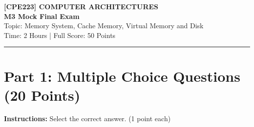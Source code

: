 \documentclass[a4paper,12pt]{article}
\begin{document}
\thispagestyle{empty}
\begin{center}
    \textbf{\Large [CPE223] COMPUTER ARCHITECTURES}\\
    \vspace{0.2cm}
    \textbf{\large M3 Mock Final Exam}\\
    \vspace{0.2cm}
    Topic: Memory System, Cache Memory, Virtual Memory and Disk \\
    Time: 2 Hours | Full Score: 50 Points \\
    \vspace{0.5cm}
\end{center}
\hrule
\vspace{0.5cm}

\section*{Part 1: Multiple Choice Questions (20 Points)}
\textbf{Instructions:} Select the correct answer. (1 point each)
\end{document}
